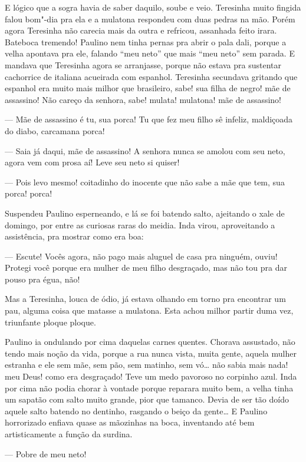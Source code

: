 E lógico que a sogra havia de saber daquilo, soube e veio. Teresinha
muito fingida falou bom"-dia pra ela e a mulatona respondeu com duas
pedras na mão. Porém agora Teresinha não carecia mais da outra e
refricou, assanhada feito irara. Bateboca tremendo! Paulino nem tinha
pernas pra abrir o pala dali, porque a velha apontava pra ele, falando
``meu neto'' que mais ``meu neto'' sem parada. E mandava que Teresinha
agora se arranjasse, porque não estava pra sustentar cachorrice de
italiana acueirada com espanhol. Teresinha secundava gritando que
espanhol era muito mais milhor que brasileiro, sabe! sua filha de negro!
mãe de assassino! Não careço da senhora, sabe! mulata! mulatona! mãe de
assassino!

--- Mãe de assassino é tu, sua porca! Tu que fez meu filho sê infeliz,
maldiçoada do diabo, carcamana porca!

--- Saia já daqui, mãe de assassino! A senhora nunca se amolou com seu
neto, agora vem com prosa aí! Leve seu neto si quiser!

--- Pois levo mesmo! coitadinho do inocente que não sabe a mãe que tem,
sua porca! porca!

Suspendeu Paulino esperneando, e lá se foi batendo salto, ajeitando o
xale de domingo, por entre as curiosas raras do meidia. Inda virou,
aproveitando a assistência, pra mostrar como era boa:

--- Escute! Vocês agora, não pago mais aluguel de casa pra ninguém,
ouviu! Protegi você porque era mulher de meu filho desgraçado, mas não
tou pra dar pouso pra égua, não!

Mas a Teresinha, louca de ódio, já estava olhando em torno pra encontrar
um pau, alguma coisa que matasse a mulatona. Esta achou milhor partir
duma vez, triunfante ploque ploque.

Paulino ia ondulando por cima daquelas carnes quentes. Chorava
assustado, não tendo mais noção da vida, porque a rua nunca vista, muita
gente, aquela mulher estranha e ele sem mãe, sem pão, sem matinho, sem
vó\ldots{} não sabia mais nada! meu Deus! como era desgraçado! Teve um medo
pavoroso no corpinho azul. Inda por cima não podia chorar à vontade
porque reparara muito bem, a velha tinha um sapatão com salto muito
grande, pior que tamanco. Devia de ser tão doído aquele salto batendo no
dentinho, rasgando o beiço da gente\ldots{} E Paulino horrorizado enfiava
quase as mãozinhas na boca, inventando até bem artisticamente a função
da surdina.

--- Pobre de meu neto!

